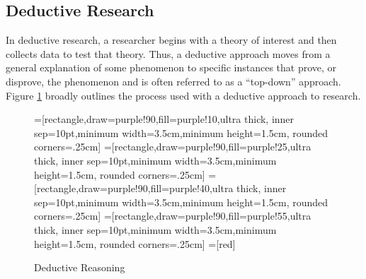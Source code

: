 \subsection{Deductive Research}

In deductive research, a researcher begins with a theory of interest and then collects data to test that theory. Thus, a deductive approach moves from a general explanation of some phenomenon to specific instances that prove, or disprove, the phenomenon and is often referred to as a ``top-down'' approach. Figure \ref{ch02.fig03} broadly outlines the process used with a deductive approach to research.

\begin{center}
	\begin{figure}[H]
		=[rectangle,draw=purple!90,fill=purple!10,ultra thick,
		inner sep=10pt,minimum width=3.5cm,minimum height=1.5cm,
		rounded corners=.25cm]
		=[rectangle,draw=purple!90,fill=purple!25,ultra thick,
		inner sep=10pt,minimum width=3.5cm,minimum height=1.5cm,
		rounded corners=.25cm]
		=[rectangle,draw=purple!90,fill=purple!40,ultra thick,
		inner sep=10pt,minimum width=3.5cm,minimum height=1.5cm,
		rounded corners=.25cm]
		=[rectangle,draw=purple!90,fill=purple!55,ultra thick,
		inner sep=10pt,minimum width=3.5cm,minimum height=1.5cm,
		rounded corners=.25cm]			
		=[red]
		\caption{Deductive Reasoning}
		\label{ch02.fig03}
	\end{figure}
\end{center}

